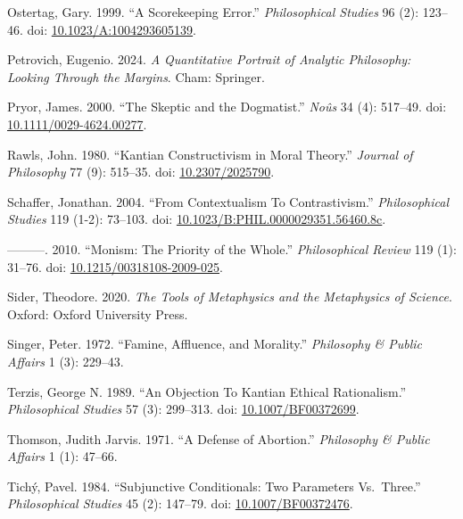 \documentclass[
  11pt,
  letterpaper,
  DIV=11,
  numbers=noendperiod,
  twoside]{scrartcl}
\newlength{\cslhangindent}
\newenvironment{CSLReferences}[2] %
 {\begin{list}{}{%
  \setlength{\itemindent}{0pt}
  \setlength{\leftmargin}{0pt}
  \setlength{\parsep}{0pt}
  \ifodd #1
   \setlength{\leftmargin}{\cslhangindent}
   \setlength{\itemindent}{-1\cslhangindent}
  \fi
  \setlength{\itemsep}{#2\baselineskip}}}
 {\end{list}}
\begin{document}
\begin{CSLReferences}{1}{0}
Ostertag, Gary. 1999. {``A Scorekeeping Error.''} \emph{Philosophical
Studies} 96 (2): 123--46. doi:
\href{https://doi.org/10.1023/A:1004293605139}{10.1023/A:1004293605139}.

Petrovich, Eugenio. 2024. \emph{A Quantitative Portrait of Analytic
Philosophy: Looking Through the Margins}. Cham: Springer.

Pryor, James. 2000. {``The Skeptic and the Dogmatist.''} \emph{Noûs} 34
(4): 517--49. doi:
\href{https://doi.org/10.1111/0029-4624.00277}{10.1111/0029-4624.00277}.

Rawls, John. 1980. {``Kantian Constructivism in Moral Theory.''}
\emph{Journal of Philosophy} 77 (9): 515--35. doi:
\href{https://doi.org/10.2307/2025790}{10.2307/2025790}.

Schaffer, Jonathan. 2004. {``From Contextualism To Contrastivism.''}
\emph{Philosophical Studies} 119 (1-2): 73--103. doi:
\href{https://doi.org/10.1023/B:PHIL.0000029351.56460.8c}{10.1023/B:PHIL.0000029351.56460.8c}.

---------. 2010. {``Monism: The Priority of the Whole.''}
\emph{Philosophical Review} 119 (1): 31--76. doi:
\href{https://doi.org/10.1215/00318108-2009-025}{10.1215/00318108-2009-025}.

Sider, Theodore. 2020. \emph{The Tools of Metaphysics and the
Metaphysics of Science}. Oxford: Oxford University Press.

Singer, Peter. 1972. {``Famine, Affluence, and Morality.''}
\emph{Philosophy \& Public Affairs} 1 (3): 229--43.

Terzis, George N. 1989. {``An Objection To Kantian Ethical
Rationalism.''} \emph{Philosophical Studies} 57 (3): 299--313. doi:
\href{https://doi.org/10.1007/BF00372699}{10.1007/BF00372699}.

Thomson, Judith Jarvis. 1971. {``A Defense of Abortion.''}
\emph{Philosophy \& Public Affairs} 1 (1): 47--66.

Tichý, Pavel. 1984. {``Subjunctive Conditionals: Two Parameters
Vs.~Three.''} \emph{Philosophical Studies} 45 (2): 147--79. doi:
\href{https://doi.org/10.1007/BF00372476}{10.1007/BF00372476}.


\end{CSLReferences}
\end{document}
